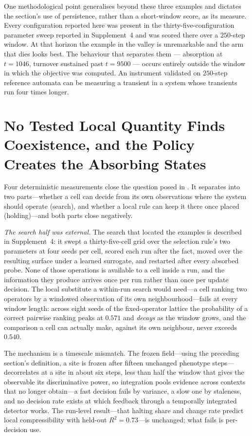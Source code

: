 One methodological point generalises beyond these three examples and
dictates the section's use of persistence, rather than a short-window score,
as its measure. Every configuration reported here was present in the
thirty-five-configuration parameter sweep reported in Supplement~4 and was scored there over a $250$-step
window. At that horizon the example in the valley is unremarkable and the arm
that dies looks best. The behaviour that separates them --- absorption at
$t = 1046$, turnover sustained past $t = 9500$ --- occurs entirely outside the
window in which the objective was computed. An instrument validated on
$250$-step reference automata can be measuring a transient in a system whose
transients run four times longer.

\section{No Tested Local Quantity Finds Coexistence, and the Policy Creates the Absorbing States}
\label{sec:exotype-question}

Four deterministic measurements close the question posed in
. It separates into two parts---whether a cell can decide
from its own observations where the system should operate (search), and
whether a local rule can keep it there once placed (holding)---and both parts
close negatively.

\emph{The search half was external.} The search that located the examples
is described in Supplement~4: it swept a
thirty-five-cell grid over the selection rule's two parameters at four seeds
per cell, scored each run after the fact, moved over the resulting surface
under a learned surrogate, and restarted after every absorbed probe. None of
those operations is available to a cell inside a run, and the information
they produce arrives once per run rather than once per update decision. The
local substitute a within-run search would need---a cell ranking two
operators by a windowed observation of its own neighbourhood---fails at every
window length:
across eight seeds of the fixed-operator lattice the probability of a correct
pairwise ranking peaks at $0.571$ and \emph{decays} as the window grows, and
the comparison a cell can actually make, against its own neighbour, never
exceeds $0.540$.

The mechanism is a timescale mismatch. The frozen field---using the preceding section's definition, a site is frozen after fifteen unchanged phenotype steps---decorrelates at a site in about six steps, less than half the window
that gives the observable its discriminative power, so integration pools evidence
across contexts that no longer obtain---a fast decision fails by variance, a
slow one by staleness, and no decision rate exists at which feedback through a
temporally integrated detector works. The run-level result---that halting share and change rate predict local compressibility with held-out $R^2 = 0.73$---is unchanged; what fails is per-decision use.

